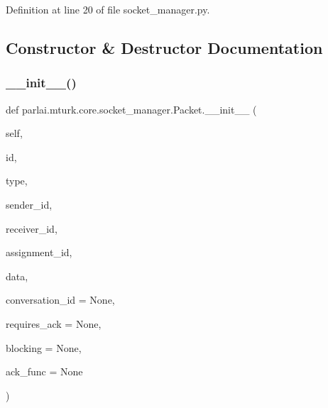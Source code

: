 Definition at line 20 of file socket\+\_\+manager.\+py.



\subsection{Constructor \& Destructor Documentation}
\mbox{\label{classparlai_1_1mturk_1_1core_1_1socket__manager_1_1Packet_a25f1f794ffd01fb70e9b6b8acd0a33be}} 
\subsubsection{\texorpdfstring{\+\_\+\+\_\+init\+\_\+\+\_\+()}{\_\_init\_\_()}}
{\footnotesize\ttfamily def parlai.\+mturk.\+core.\+socket\+\_\+manager.\+Packet.\+\_\+\+\_\+init\+\_\+\+\_\+ (\begin{DoxyParamCaption}\item[{}]{self,  }\item[{}]{id,  }\item[{}]{type,  }\item[{}]{sender\+\_\+id,  }\item[{}]{receiver\+\_\+id,  }\item[{}]{assignment\+\_\+id,  }\item[{}]{data,  }\item[{}]{conversation\+\_\+id = {\ttfamily None},  }\item[{}]{requires\+\_\+ack = {\ttfamily None},  }\item[{}]{blocking = {\ttfamily None},  }\item[{}]{ack\+\_\+func = {\ttfamily None} }\end{DoxyParamCaption})}

